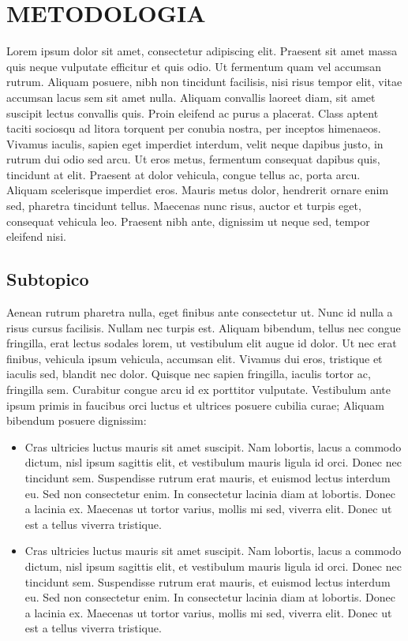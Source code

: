\chapter{METODOLOGIA}

Lorem ipsum dolor sit amet, consectetur adipiscing elit. Praesent sit amet massa quis neque vulputate efficitur et quis odio. Ut fermentum quam vel accumsan rutrum. Aliquam posuere, nibh non tincidunt facilisis, nisi risus tempor elit, vitae accumsan lacus sem sit amet nulla. Aliquam convallis laoreet diam, sit amet suscipit lectus convallis quis. Proin eleifend ac purus a placerat. Class aptent taciti sociosqu ad litora torquent per conubia nostra, per inceptos himenaeos. Vivamus iaculis, sapien eget imperdiet interdum, velit neque dapibus justo, in rutrum dui odio sed arcu. Ut eros metus, fermentum consequat dapibus quis, tincidunt at elit. Praesent at dolor vehicula, congue tellus ac, porta arcu. Aliquam scelerisque imperdiet eros. Mauris metus dolor, hendrerit ornare enim sed, pharetra tincidunt tellus. Maecenas nunc risus, auctor et turpis eget, consequat vehicula leo. Praesent nibh ante, dignissim ut neque sed, tempor eleifend nisi.

\section{Subtopico}

Aenean rutrum pharetra nulla, eget finibus ante consectetur ut. Nunc id nulla a risus cursus facilisis. Nullam nec turpis est. Aliquam bibendum, tellus nec congue fringilla, erat lectus sodales lorem, ut vestibulum elit augue id dolor. Ut nec erat finibus, vehicula ipsum vehicula, accumsan elit. Vivamus dui eros, tristique et iaculis sed, blandit nec dolor. Quisque nec sapien fringilla, iaculis tortor ac, fringilla sem. Curabitur congue arcu id ex porttitor vulputate. Vestibulum ante ipsum primis in faucibus orci luctus et ultrices posuere cubilia curae; Aliquam bibendum posuere dignissim:
\begin{itemize}
    \item Cras ultricies luctus mauris sit amet suscipit. Nam lobortis, lacus a commodo dictum, nisl ipsum sagittis elit, et vestibulum mauris ligula id orci. Donec nec tincidunt sem. Suspendisse rutrum erat mauris, et euismod lectus interdum eu. Sed non consectetur enim. In consectetur lacinia diam at lobortis. Donec a lacinia ex. Maecenas ut tortor varius, mollis mi sed, viverra elit. Donec ut est a tellus viverra tristique.
    \item Cras ultricies luctus mauris sit amet suscipit. Nam lobortis, lacus a commodo dictum, nisl ipsum sagittis elit, et vestibulum mauris ligula id orci. Donec nec tincidunt sem. Suspendisse rutrum erat mauris, et euismod lectus interdum eu. Sed non consectetur enim. In consectetur lacinia diam at lobortis. Donec a lacinia ex. Maecenas ut tortor varius, mollis mi sed, viverra elit. Donec ut est a tellus viverra tristique.
\end{itemize}